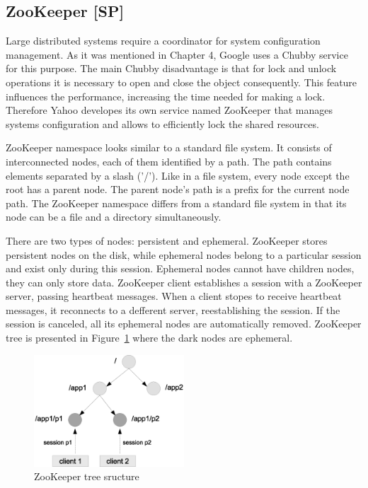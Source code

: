 \subsection{ZooKeeper [SP]}

Large distributed systems require a coordinator for system configuration management.
As it was mentioned in Chapter 4, Google uses a Chubby service for this purpose.
The main Chubby disadvantage is that for lock and unlock operations it is necessary to open and close the object consequently.
This feature influences the performance, increasing the time needed for making a lock.
Therefore Yahoo developes its own service named ZooKeeper that manages systems configuration and allows to efficiently lock the shared resources.

ZooKeeper namespace looks similar to a standard file system.
It consists of interconnected nodes, each of them identified by a path.
The path contains elements separated by a slash ('/').
Like in a file system, every node except the root has a parent node.
The parent node's path is a prefix for the current node path.
The ZooKeeper namespace differs from a standard file system in that its node can be a file and a directory simultaneously.

There are two types of nodes: persistent and ephemeral.
ZooKeeper stores persistent nodes on the disk, while ephemeral nodes belong to a particular session and exist only during this session.
Ephemeral nodes cannot have children nodes, they can only store data.
ZooKeeper client establishes a session with a ZooKeeper server, passing heartbeat messages.
When a client stopes to receive heartbeat messages, it reconnects to a defferent server, reestablishing the session.
If the session is canceled, all its ephemeral nodes are automatically removed.
ZooKeeper tree is presented in Figure~\ref{fig:zookeeper_tree} where the dark nodes are ephemeral.

\begin{figure}
  \centering
  \includegraphics [width=0.5\textwidth]{images/zookeeper_tree}
  \caption{ZooKeeper tree sructure}
  \label{fig:zookeeper_tree}
\end{figure}

